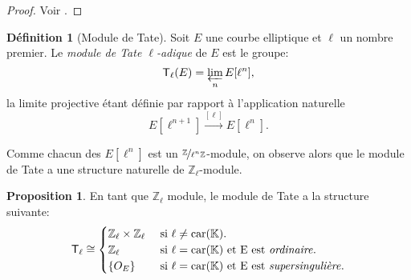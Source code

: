 \documentclass[10pt,a4paper]{book}
\theoremstyle{plain}
\theoremstyle{definition}
\theoremstyle{definition}
\theoremstyle{definition}
\theoremstyle{definition}
\newtheorem{prop}[thm]{Proposition}
\theoremstyle{definition}
\newtheorem{defi}[thm]{Définition}
\theoremstyle{remark}
\theoremstyle{remark}
\theoremstyle{definition}
\begin{document}
\begin{proof}
Voir \cite[Corrolary III.6.4]{Silv1}.
\end{proof}


\begin{defi}[Module de Tate]
Soit $E$ une courbe elliptique et $\ell$ un nombre premier. Le \emph{module de Tate $\ell$-adique} de $E$ est le groupe:
\begin{equation*}
\mathsf{T}_{\ell}(E)=\varprojlim_nE[\ell^n],
\end{equation*}
la limite projective étant définie par rapport à l'application naturelle
\begin{equation*}
E[\ell^{n+1}] \overset{[\ell]}{\rightarrow} E[\ell^n].
\end{equation*}
\end{defi}
Comme chacun des $E[\ell^n]$ est un $\nicefrac{\mathbb{Z}}{\ell^n\mathbb{Z}}$-module, on observe alors que le module de Tate a une structure naturelle de $\mathbb{Z}_{\ell}$-module.
\begin{prop}
En tant que $\mathbb{Z}_{\ell}$ module, le module de Tate a la structure suivante:
\begin{equation*}
\mathsf{T}_{\ell} \cong 
\begin{cases} 
\mathbb{Z}_{\ell} \times \mathbb{Z}_{\ell} &\text{ si } \ell \neq \mathrm{car}(\mathbb{K}). \\
\mathbb{Z}_{\ell} &\text{ si } \ell=\mathrm{car}(\mathbb{K})  \text{ et E est \emph{ordinaire}}. \\
\{O_E\} &\text{ si } \ell=\mathrm{car}(\mathbb{K})  \text{ et E est \emph{supersingulière}}.
\end{cases}
\end{equation*}
\end{prop}

\end{document}
